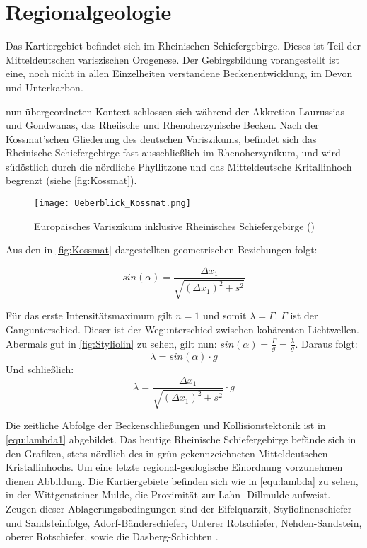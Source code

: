\chapter{Regionalgeologie}
\authorAnGu
Das Kartiergebiet befindet sich im Rheinischen Schiefergebirge. Dieses ist Teil der Mitteldeutschen variszischen Orogenese. Der Gebirgsbildung vorangestellt ist eine, noch nicht in allen Einzelheiten verstandene Beckenentwicklung, im Devon und Unterkarbon. \cite{franke17}

 nun übergeordneten Kontext schlossen sich während der Akkretion Laurussias und Gondwanas, das Rheiische und Rhenoherzynische Becken. Nach der Kossmat'schen Gliederung des deutschen Variszikums, befindet sich das Rheinische Schiefergebirge fast ausschließlich im Rhenoherzynikum, und wird südöstlich durch die nördliche Phyllitzone und das Mitteldeutsche Kritallinhoch begrenzt (siehe \autoref{fig:Kossmat}).

\begin{figure}[!htb]
\centering
\texttt{[image: Ueberblick\_Kossmat.png]}
\caption{Europäisches Variszikum inklusive Rheinisches Schiefergebirge (\cite{franke17})}
\label{fig:Kossmat}
\end{figure} 

Aus den in \autoref{fig:Kossmat} dargestellten geometrischen Beziehungen folgt:

\begin{equation}
 sin(\alpha)=\frac{\Delta x_1}{\sqrt{(\Delta x_1)^2+s^2}}
 \label{equ:Franke1}
\end{equation}

Für das erste Intensitätsmaximum gilt $n=1$ und somit $\lambda=\Gamma$. $\Gamma$ ist der Gangunterschied. Dieser ist der Wegunterschied  \cite{franke17} zwischen kohärenten Lichtwellen. Abermals gut in \autoref{fig:Styliolin} zu sehen, gilt nun: $sin(\alpha)=\frac{\Gamma}{g}=\frac{\lambda}{g}$. Daraus folgt:
\begin{equation}
\lambda=sin(\alpha)\cdot g
 \label{equ:lambda}
\end{equation}
Und schließlich:
\begin{equation}
\lambda=\frac{\Delta x_1}{\sqrt{(\Delta x_1)^2+s^2}}\cdot g
 \label{equ:lambda1}
\end{equation}


Die zeitliche Abfolge der Beckenschließungen und Kollisionstektonik ist in \autoref{equ:lambda1} abgebildet. Das heutige Rheinische Schiefergebirge befände sich in den Grafiken, stets nördlich des in grün gekennzeichneten Mitteldeutschen Kristallinhochs. Um eine letzte regional-geologische Einordnung vorzunehmen dienen Abbildung. Die Kartiergebiete befinden sich wie in \autoref{equ:lambda} zu sehen, in der Wittgensteiner Mulde, die Proximität zur Lahn- Dillmulde aufweist.  Zeugen dieser Ablagerungsbedingungen sind der Eifelquarzit, Styliolinenschiefer- und Sandsteinfolge, Adorf-Bänderschiefer, Unterer Rotschiefer, Nehden-Sandstein, oberer Rotschiefer, sowie die Dasberg-Schichten \cite{franke17}. 

